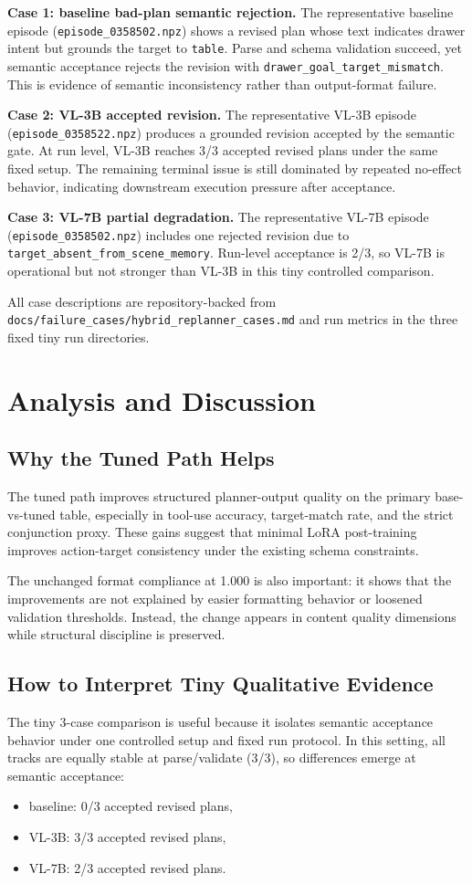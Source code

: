 \documentclass{article}
\begin{document}
\textbf{Case 1: baseline bad-plan semantic rejection.}
The representative baseline episode (\texttt{episode\_0358502.npz}) shows a revised plan whose text indicates drawer intent but grounds the target to \texttt{table}. Parse and schema validation succeed, yet semantic acceptance rejects the revision with \texttt{drawer\_goal\_target\_mismatch}. This is evidence of semantic inconsistency rather than output-format failure.

\textbf{Case 2: VL-3B accepted revision.}
The representative VL-3B episode (\texttt{episode\_0358522.npz}) produces a grounded revision accepted by the semantic gate. At run level, VL-3B reaches 3/3 accepted revised plans under the same fixed setup. The remaining terminal issue is still dominated by repeated no-effect behavior, indicating downstream execution pressure after acceptance.

\textbf{Case 3: VL-7B partial degradation.}
The representative VL-7B episode (\texttt{episode\_0358502.npz}) includes one rejected revision due to \texttt{target\_absent\_from\_scene\_memory}. Run-level acceptance is 2/3, so VL-7B is operational but not stronger than VL-3B in this tiny controlled comparison.

All case descriptions are repository-backed from \texttt{docs/failure\_cases/hybrid\_replanner\_cases.md} and run metrics in the three fixed tiny run directories.

\section{Analysis and Discussion}
\subsection{Why the Tuned Path Helps}
The tuned path improves structured planner-output quality on the primary base-vs-tuned table, especially in tool-use accuracy, target-match rate, and the strict conjunction proxy. These gains suggest that minimal LoRA post-training improves action-target consistency under the existing schema constraints.

The unchanged format compliance at 1.000 is also important: it shows that the improvements are not explained by easier formatting behavior or loosened validation thresholds. Instead, the change appears in content quality dimensions while structural discipline is preserved.

\subsection{How to Interpret Tiny Qualitative Evidence}
The tiny 3-case comparison is useful because it isolates semantic acceptance behavior under one controlled setup and fixed run protocol. In this setting, all tracks are equally stable at parse/validate (3/3), so differences emerge at semantic acceptance:
\begin{itemize}[leftmargin=*]
  \item baseline: 0/3 accepted revised plans,
  \item VL-3B: 3/3 accepted revised plans,
  \item VL-7B: 2/3 accepted revised plans.
\end{itemize}
\end{document}
